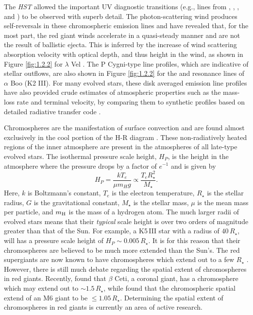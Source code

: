 The \textit{HST} allowed the important UV diagnostic transitions (e.g., lines from , , , and ) to be observed with superb detail. The photon-scattering wind produces self-reversals in these chromospheric emission lines and have revealed that, for the most part, the red giant winds accelerate in a quasi-steady manner and are not the result of ballistic ejecta. This is inferred by the increase of wind scattering absorption velocity with optical depth, and thus height in the wind, as shown in Figure \ref{fig:1.2.2} for $\lambda$ Vel \citep{carpenter_1999}. The P Cygni-type line profiles, which are indicative of stellar outflows, are also shown in Figure \ref{fig:1.2.2} for the  and  resonance lines of $\alpha$ Boo (K2 III). For many evolved stars, these disk averaged emission line profiles have also provided crude estimates of atmospheric properties such as the mass-loss rate and terminal velocity, by comparing them to synthetic profiles based on detailed radiative transfer code \citep[e.g.,][]{robinson_1998}.

Chromospheres are the manifestation of surface convection and are found almost exclusively in the cool portion of the H-R diagram \citep{ayres_2010b}. These non-radiatively  heated regions of the inner atmosphere are present in the atmospheres of all late-type evolved stars. The isothermal pressure scale height, $H_{P}$, is the height in the atmosphere where the pressure drops by a factor of $e^{-1}$ and is given by
\begin{equation}
H_{P}=\frac{kT_e}{\mu m_{H} g} \propto \frac{T_{e}R_{\star}^2}{M_{\star}}.
\end{equation}
Here, $k$ is Boltzmann's constant, $T_{e}$ is the electron temperature, $R_{\star}$ is the stellar radius, $G$ is the gravitational constant, $M_{\star}$ is the stellar mass, $\mu$ is the mean mass per particle, and $m_{\rm{H}}$ is the mass of a hydrogen atom. The much larger radii of evolved stars means that their \textit{typical} scale height is over two orders of magnitude greater than that of the Sun. For example, a K5\,III star with a radius of $40\,R_{\star}$, will has a pressure scale height of $H_{P} \sim 0.005\,R_{\star}$. It is for this reason that their chromospheres are believed to be much more extended than the Sun's. The red supergiants are now known to have chromospheres which extend out to a few $R_{\star}$ \citep{lim_1998, harper_2001}. However, there is still much debate regarding the spatial extent of chromospheres in red giants. Recently, \cite{berio_2011} found that $\beta$ Ceti, a coronal giant, has a chromosphere which may extend out to $\sim 1.5\,R_{\star}$, while \cite{luttermoser_1994} found that the chromospheric spatial extend of an M6 giant to be $\le 1.05\,R_{\star}$. Determining the spatial extent of chromospheres in red giants is currently an area of active research.


